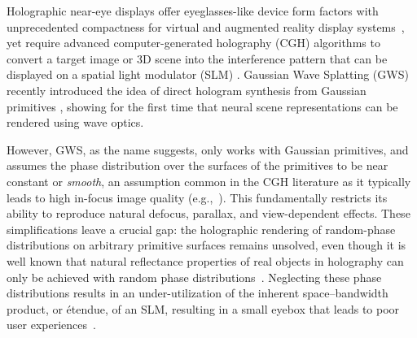 
Holographic near-eye displays offer eyeglasses-like device form factors with unprecedented compactness for virtual and augmented reality display systems~\cite{maimone2017holographic,kim:HolographicGlasses,jang2024waveguide,gopakumar2024full, Choi:2025:HolographicMR}, yet require advanced computer-generated holography (CGH) algorithms to convert a target image or 3D scene into the interference pattern that can be displayed on a spatial light modulator (SLM) \cite{pi2022review,matsushima2020introduction}. Gaussian Wave Splatting (GWS) \cite{choi2025gaussian} recently introduced the idea of direct hologram synthesis from Gaussian primitives \cite{kerbl3Dgaussians, huang20242d}, showing for the first time that neural scene representations can be rendered using wave optics.

However, GWS, as the name suggests, only works with Gaussian primitives, and assumes the phase distribution over the surfaces of the primitives to be near constant or \emph{smooth}, an assumption common in the CGH literature as it typically leads to high in-focus image quality (e.g.,~\cite{maimone2017holographic,shi2021towards}). This fundamentally restricts its ability to reproduce natural defocus, parallax, and view-dependent effects. These simplifications leave a crucial gap: the holographic rendering of random-phase distributions on arbitrary primitive surfaces remains unsolved, even though it is well known that natural reflectance properties of real objects in holography can only be achieved with random phase distributions~\cite{goodman_statistical_optics_2nd,matsushima2020introduction,st1995phase}. Neglecting these phase distributions results in an under-utilization of the inherent space--bandwidth product, or \'etendue, of an SLM, resulting in a small eyebox that leads to poor user experiences~\cite{kim2022accommodative,kim2024holographic}. %


